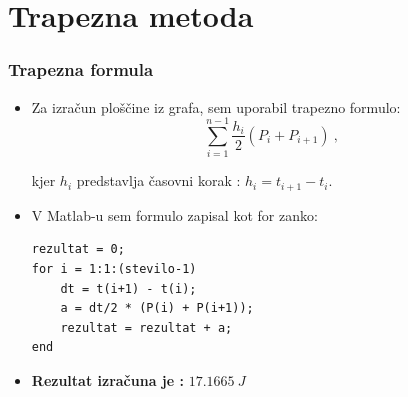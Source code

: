 \documentclass[10pt]{beamer}
\begin{document}
\section{Trapezna metoda}
\begin{frame}[fragile]
\frametitle{Trapezna formula}
\begin{itemize}
   
\item Za izračun ploščine iz grafa, sem uporabil trapezno formulo:
$$\sum_{i=1}^{n-1} \frac{h_i}{2} (P_i + P_{i+1})\ ,$$

kjer $h_i$ predstavlja časovni korak : $h_i = t_{i+1} - t_i$. 

\item V Matlab-u sem formulo zapisal kot for zanko:
\begin{verbatim}
rezultat = 0;
for i = 1:1:(stevilo-1)
    dt = t(i+1) - t(i); 
    a = dt/2 * (P(i) + P(i+1));
    rezultat = rezultat + a;
end
\end{verbatim}
\item \textbf{Rezultat izračuna je :} $17.1665\ J$
\end{itemize}
\end{frame}
\end{document}
